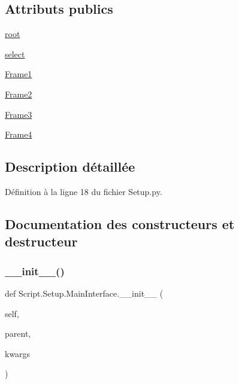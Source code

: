 \subsection*{Attributs publics}
\begin{DoxyCompactItemize}
\item 
\hyperlink{classScript_1_1Setup_1_1MainInterface_a9436309be16e61a1527bdb8a62514de4}{root}
\item 
\hyperlink{classScript_1_1Setup_1_1MainInterface_a55c2c685b44f6ece1c4a9ea1eb8db30c}{select}
\item 
\hyperlink{classScript_1_1Setup_1_1MainInterface_a8ad532a968e6ccc0a5a1141d89b0bc79}{Frame1}
\item 
\hyperlink{classScript_1_1Setup_1_1MainInterface_a5e740f301b7cb8dd3fb145b6d0dc4af2}{Frame2}
\item 
\hyperlink{classScript_1_1Setup_1_1MainInterface_ab2dbe8bd2ef4977361a1a77c67648d3f}{Frame3}
\item 
\hyperlink{classScript_1_1Setup_1_1MainInterface_adbe875b37eb9ba01b2c84867dea6e526}{Frame4}
\end{DoxyCompactItemize}


\subsection{Description détaillée}


Définition à la ligne 18 du fichier Setup.\+py.



\subsection{Documentation des constructeurs et destructeur}
\mbox{\label{classScript_1_1Setup_1_1MainInterface_a342ef881ed8e49715e8e071026290d33}} 
\subsubsection{\texorpdfstring{\+\_\+\+\_\+init\+\_\+\+\_\+()}{\_\_init\_\_()}}
{\footnotesize\ttfamily def Script.\+Setup.\+Main\+Interface.\+\_\+\+\_\+init\+\_\+\+\_\+ (\begin{DoxyParamCaption}\item[{}]{self,  }\item[{}]{parent,  }\item[{}]{kwargs }\end{DoxyParamCaption})}



